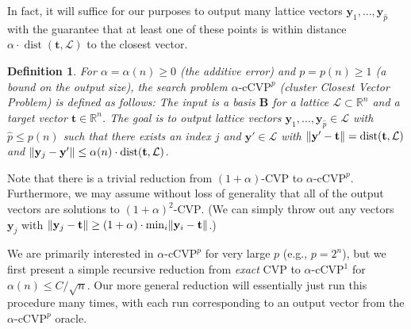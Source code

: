 \documentclass[11pt]{article}
\newtheorem{definition}[theorem]{Definition}
\newcommand{\R}{\ensuremath{\mathbb{R}}}
\renewcommand{\vec}[1]{\ensuremath{\mathbf{#1}}}
\newcommand{\basis}{\ensuremath{\mathbf{B}}}
\newcommand{\problem}[1]{\mbox{#1}\xspace}
\newcommand{\lat}{\mathcal{L}}
\DeclareMathOperator{\dist}{dist}
\DeclarePairedDelimiter\length{\lVert}{\rVert}
\begin{document}
In fact, it will suffice for our purposes to output many lattice vectors $\vec{y}_1,\ldots, \vec{y}_{\hat{p}}$ with the guarantee that at least one of these points is within distance $\alpha \cdot \dist(\vec{t}, \lat)$ to the closest vector.

\begin{definition}
\label{def:nCVP-new}
For $\alpha = \alpha(n) \geq 0$ (the additive error) and $p = p(n) \geq 1$ (a bound on the output size), the search problem $\alpha\text{-}\problem{cCVP}^p$ (cluster Closest Vector Problem) is defined as follows: The input is a basis $\basis$ for a lattice $\lat \subset \R^n$ and a target vector $\vec{t} \in \R^n$. The goal is to output lattice vectors $\vec{y}_1,\ldots, \vec{y}_{\hat{p}} \in \lat $ with $\hat{p} \leq p(n)$ such that there exists an index $j$ and $\vec{y}' \in \lat$ with $\length{\vec{y}' - \vec{t}} = \dist(\vec{t}, \lat)$ and $\length{\vec{y}_j - \vec{y}'} \leq \alpha(n) \cdot \dist(\vec{t}, \lat)$.
\end{definition}

Note that there is a trivial reduction from $(1+\alpha)\text{-}\problem{CVP}$ to $\alpha\text{-}\problem{cCVP}^p$. Furthermore, we may assume without loss of generality that all of the output vectors are solutions to $(1+\alpha)^2\text{-}\problem{CVP}$. (We can simply throw out any vectors $\vec{y}_j$ with $\length{\vec{y}_j - \vec{t}} \geq (1+\alpha) \cdot \min_i \length{\vec{y}_i - \vec{t}}$.) 

We are primarily interested in $\alpha\text{-}\problem{cCVP}^p$ for very large $p$ (e.g., $p = 2^n$), but we first present a simple recursive reduction from \emph{exact} $\problem{CVP}$ to $\alpha\text{-}\problem{cCVP}^1$ for $\alpha(n) \leq C/\sqrt{n}$. Our more general reduction will essentially just run this procedure many times, with each run corresponding to an output vector from the $\alpha\text{-}\problem{cCVP}^p$ oracle.
\end{document}
